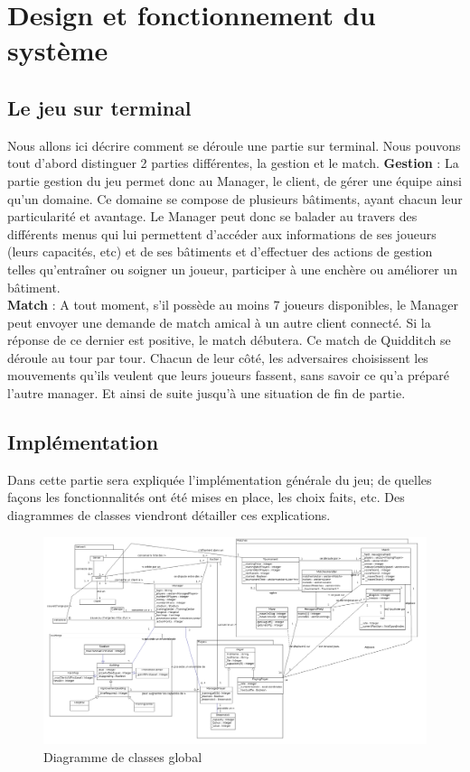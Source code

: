 \documentclass[a4paper,titlepage]{scrreprt}
\begin{document}
\section{Design et fonctionnement du système}
  \subsection{Le jeu sur terminal}
Nous allons ici décrire comment se déroule une partie sur terminal. Nous pouvons tout d'abord distinguer 2 parties différentes, la gestion et le match.
\textbf{Gestion} : La partie gestion du jeu permet donc au Manager, le client, de gérer une équipe ainsi qu'un domaine. Ce domaine se compose de plusieurs bâtiments, ayant chacun leur particularité et avantage. Le Manager peut donc se balader au travers des différents menus qui lui permettent d'accéder aux informations de ses joueurs (leurs capacités, etc) et de ses bâtiments et d'effectuer des actions de gestion telles qu'entraîner ou soigner un joueur, participer à une enchère ou améliorer un bâtiment. \\
\textbf{Match} : A tout moment, s'il possède au moins 7 joueurs disponibles, le Manager peut envoyer une demande de match amical à un autre client connecté. Si la réponse de ce dernier est positive, le match débutera. Ce match de Quidditch se déroule au tour par tour. Chacun de leur côté, les adversaires choisissent les mouvements qu'ils veulent que leurs joueurs fassent, sans savoir ce qu'a préparé l'autre manager. Et ainsi de suite jusqu'à une situation de fin de partie. \\

  \subsection{Implémentation}
  
  Dans cette partie sera expliquée l'implémentation générale du jeu; de quelles façons les fonctionnalités ont été mises en place, les choix faits, etc. Des diagrammes de classes viendront détailler ces explications.

    \begin{figure}[H]
      \includegraphics[scale=0.27]{uml/class/Global.png}%
      \caption{Diagramme de classes global}
    \end{figure}
\end{document}
